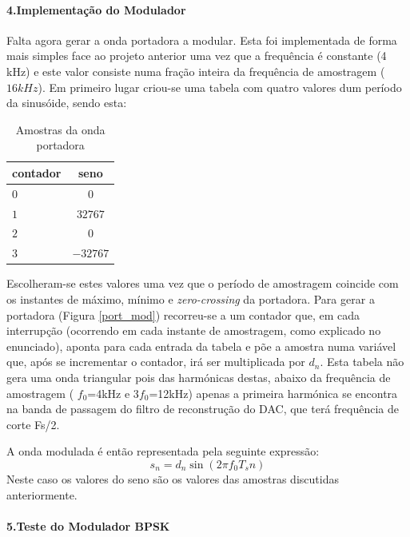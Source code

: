 \documentclass[11pt]{article}
\numberwithin{equation}{section}
\begin{document}
\paragraph{4.Implementação do Modulador} \hspace{0pt}
\label{para:P2-4}

Falta agora gerar a onda portadora a modular. Esta foi implementada de forma mais simples face ao projeto anterior uma vez que a frequência é constante (4 kHz) e este valor consiste numa fração inteira da frequência de amostragem ($16 kHz$).
Em primeiro lugar criou-se uma tabela com quatro valores dum período da sinusóide, sendo esta:
\begin{table}[H]
	\centering
	\caption{Amostras da onda portadora}
	\label{tab:amostras}
	\begin{tabular}[c]{|l||c|}
		\hline \textbf{contador} & \textbf{seno}\\ 
		\hline $ 0 $ & $ 0 $\\ 
		\hline $ 1 $ & $ 32767 $  \\ 
		\hline $ 2 $ & $ 0 $ \\ 
		\hline $ 3 $ & $ -32767 $ \\
		\hline
	\end{tabular}
\end{table}

Escolheram-se estes valores uma vez que o período de amostragem coincide com os instantes de máximo, mínimo e \textit{zero-crossing} da portadora. Para gerar a portadora (Figura \ref{port_mod}) recorreu-se a um contador que, em cada interrupção (ocorrendo em cada instante de amostragem, como explicado no enunciado), aponta para cada entrada da tabela e põe a amostra numa variável que, após se incrementar o contador, irá ser multiplicada por $d_n$. Esta tabela não gera uma onda triangular pois das harmónicas destas, abaixo da frequência de amostragem ( $f_0$=4kHz e 3$f_0$=12kHz) apenas a primeira harmónica se encontra na banda de passagem do filtro de reconstrução do DAC, que terá frequência de corte Fs/2.

A onda modulada é então representada pela seguinte expressão:
\begin{equation}
	s_n= d_n \sin(2 \pi f_0T_sn) 
\end{equation}
Neste caso os valores do seno são os valores das amostras discutidas anteriormente.
\vspace{2 mm}
                                              
\paragraph{5.Teste do Modulador BPSK} \hspace{0pt}
\label{para:P2-5}
\end{document}
